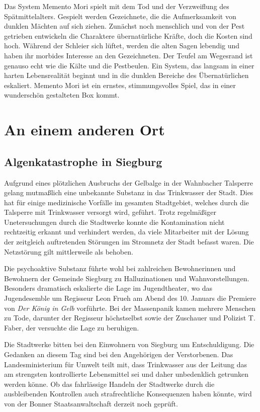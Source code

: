 \documentclass[final]{multiversum}
\begin{document}
Das System Memento Mori spielt mit dem Tod und der Verzweiflung des Spätmittelalters.
Gespielt werden Gezeichnete, die die Aufmerksamkeit von dunklen Mächten auf sich ziehen.
Zunächst noch menschlich und von der Pest getrieben entwickeln die Charaktere übernatürliche Kräfte, doch die Kosten sind hoch.
Während der Schleier sich lüftet, werden die alten Sagen lebendig und haben ihr morbides Interesse an den Gezeichneten.
Der Teufel am Wegesrand ist genauso echt wie die Kälte und die Pestbeulen.
Ein System, das langsam in einer harten Lebensrealität beginnt und in die dunklen Bereiche des Übernatürlichen eskaliert.
Memento Mori ist ein ernstes, stimmungsvolles Spiel, das in einer wunderschön gestalteten Box kommt.

\section{An einem anderen Ort}

\subsection{Algenkatastrophe in Siegburg}

Aufgrund eines plötzlichen Ausbruchs der Gelbalge in der Wahnbacher Talsperre gelang mutmaßlich eine unbekannte Substanz in das Trinkwasser der Stadt. Dies hat für einige medizinische Vorfälle im gesamten Stadtgebiet, welches durch die Talsperre mit Trinkwasser versorgt wird, geführt. Trotz regelmäßiger Unetersuchungen durch die Stadtwerke konnte die Kontamination nicht rechtzeitig erkannt und verhindert werden, da viele Mitarbeiter mit der Lösung der zeitgleich auftretenden Störungen im Stromnetz der Stadt befasst waren. Die Netzstörung gilt mittlerweile als behoben. 

Die psychoaktive Substanz führte wohl bei zahlreichen Bewohnerinnen und Bewohnern der Gemeinde Siegburg zu Halluzinationen und Wahnvorstellungen. Besonders dramatisch eskalierte die Lage im Jugendtheater, wo das Jugendesemble um Regisseur Leon Frueh am Abend des 10. Januars die Premiere von \textit{Der König in Gelb} vorführte. Bei der Massenpanik kamen mehrere Menschen zu Tode, darunter der Regisseur höchstselbst sowie der Zuschauer und Polizist T. Faber, der versuchte die Lage zu beruhigen.

Die Stadtwerke bitten bei den Einwohnern von Siegburg um Entschuldigung. Die Gedanken an diesem Tag sind bei den Angehörigen der Verstorbenen. Das Landesministerium für Umwelt teilt mit, dass Trinkwasser aus der Leitung das am strengsten kontrollierte Lebensmittel sei und daher unbedenklich getrunken werden könne. Ob das fahrlässige Handeln der Stadtwerke durch die ausbleibenden Kontrollen auch strafrechtliche Konsequenzen haben könnte, wird von der Bonner Staatsanwaltschaft derzeit noch geprüft. 
\end{document}

